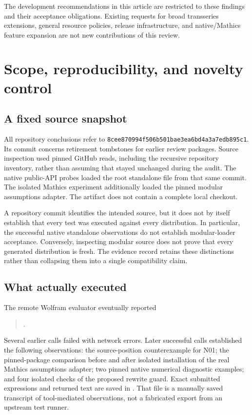 \documentclass[11pt,letterpaper]{article}
\newcommand{\code}[1]{\texttt{\detokenize{#1}}}
\newcommand{\pin}{\texttt{8cee870994f506b501bae3ea6bd4a3a7edb895c1}}
\begin{document}
The development recommendations in this article are restricted to these
findings and their acceptance obligations. Existing requests for broad
transseries extensions, general resource policies, release infrastructure, and
native/Mathics feature expansion are not new contributions of this review.

\section{Scope, reproducibility, and novelty control}
\subsection{A fixed source snapshot}

All repository conclusions refer to \pin. Its commit concerns retirement
tombstones for earlier review packages. Source inspection used pinned GitHub
reads, including the recursive repository inventory, rather than assuming that
\code{main} stayed unchanged during the audit. The native public-API probes
loaded the root standalone file from that same commit. The isolated Mathics
experiment additionally loaded the pinned modular assumptions adapter.
The artifact does not contain a complete local checkout.\cite{repo,main,protect}

A repository commit identifies the intended source, but it does not by itself
establish that every test was executed against every distribution. In
particular, the successful native standalone observations do not establish
modular-loader acceptance. Conversely, inspecting modular source does not
prove that every generated distribution is fresh. The evidence record retains
these distinctions rather than collapsing them into a single compatibility
claim.

\subsection{What actually executed}

The remote Wolfram evaluator eventually reported
\begin{quote}\small
\code{15.0.0 for Linux x86 (64-bit) (May 6, 2026)}.
\end{quote}
Several earlier calls failed with network errors. Later successful calls
established the following observations: the source-position counterexample for
N01; the pinned-package comparison before and after isolated installation of
the real Mathics assumptions adapter; two pinned native numerical diagnostic
examples; and four isolated checks of the proposed rewrite guard. Exact
submitted expressions and returned text are saved in
. That file is a manually saved
transcript of tool-mediated observations, not a fabricated export from an
upstream test runner.
\end{document}
